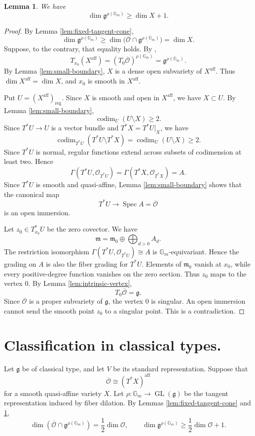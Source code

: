 \documentclass[12pt]{article}
\newtheorem{lemma}[theorem]{Lemma}
\theoremstyle{remark}
\theoremstyle{plain}
\DeclareMathOperator{\Spec}{Spec}
\newcommand{\Gm}{\mathbb G_m}
\newcommand{\aff}{\mathrm{aff}}
\begin{document}
\begin{lemma}\label{lem:strict-bound}
We have
\[
\dim\mathfrak g^{\rho(\Gm)}\geq\dim X+1.
\]
\end{lemma}

\begin{proof}
By Lemma \ref{lem:fixed-tangent-cone},
\[
\dim\mathfrak g^{\rho(\Gm)}
\geq
\dim\bigl(\overline{\mathcal O}\cap\mathfrak g^{\rho(\Gm)}\bigr)
=\dim X.
\]
Suppose, to the contrary, that equality holds. By
\cite[Lemma 5.4]{Jia},
\[
T_{x_0}(X^{\aff})
=(T_0\overline{\mathcal O})^{\rho(\Gm)}
=\mathfrak g^{\rho(\Gm)}.
\]
By Lemma \ref{lem:small-boundary}, $X$ is a dense open subvariety of
$X^{\aff}$. Thus $\dim X^{\aff}=\dim X$, and $x_0$ is smooth in
$X^{\aff}$.

Put $U=(X^{\aff})_{\mathrm{reg}}$. Since $X$ is smooth and open in
$X^{\aff}$, we have $X\subset U$. By Lemma \ref{lem:small-boundary},
\[
\operatorname{codim}_U(U\setminus X)\geq2.
\]
Since $T^*U\to U$ is a vector bundle and $T^*X=T^*U|_X$, we have
\[
\operatorname{codim}_{T^*U}(T^*U\setminus T^*X)
=\operatorname{codim}_U(U\setminus X)\geq2.
\]
Since $T^*U$ is normal, regular functions extend across subsets of
codimension at least two. Hence
\[
\Gamma(T^*U,\mathcal O_{T^*U})
=
\Gamma(T^*X,\mathcal O_{T^*X})=A.
\]
Since $T^*U$ is smooth and quasi-affine, Lemma
\ref{lem:small-boundary} shows that the canonical map
\[
T^*U\longrightarrow\Spec A=\overline{\mathcal O}
\]
is an open immersion.

Let $z_0\in T^*_{x_0}U$ be the zero covector. We have
\[
\mathfrak m=\mathfrak m_0\oplus\bigoplus_{d>0}A_d.
\]
The restriction isomorphism
$\Gamma(T^*U,\mathcal O_{T^*U})\cong A$ is $\Gm$-equivariant. Hence
the grading on $A$ is also the fiber grading for $T^*U$.
Elements of $\mathfrak m_0$ vanish at $x_0$, while every
positive-degree function vanishes on the zero section. Thus $z_0$
maps to the vertex $0$. By Lemma \ref{lem:intrinsic-vertex},
\[
T_0\overline{\mathcal O}=\mathfrak g.
\]
Since $\overline{\mathcal O}$ is a proper subvariety of $\mathfrak g$,
the vertex $0$ is singular. An open immersion cannot send the smooth
point $z_0$ to a singular point. This is a contradiction.
\end{proof}

\section{Classification in classical types.}\label{sec:classical}

Let $\mathfrak g$ be of classical type, and let $V$ be its standard
representation. Suppose that
\[
\overline{\mathcal O}\cong(T^*X)^{\aff}
\]
for a smooth quasi-affine variety $X$. Let
$\rho:\Gm\to\operatorname{GL}(\mathfrak g)$ be the tangent
representation induced by fiber dilation.
By Lemmas \ref{lem:fixed-tangent-cone} and \ref{lem:strict-bound},
\begin{equation}\label{eq:fixed-dimensions}
\dim(\overline{\mathcal O}\cap \mathfrak g^{\rho(\Gm)})
=\frac12\dim\mathcal O,
\qquad
\dim \mathfrak g^{\rho(\Gm)}\geq\frac12\dim\mathcal O+1.
\end{equation}
\end{document}
